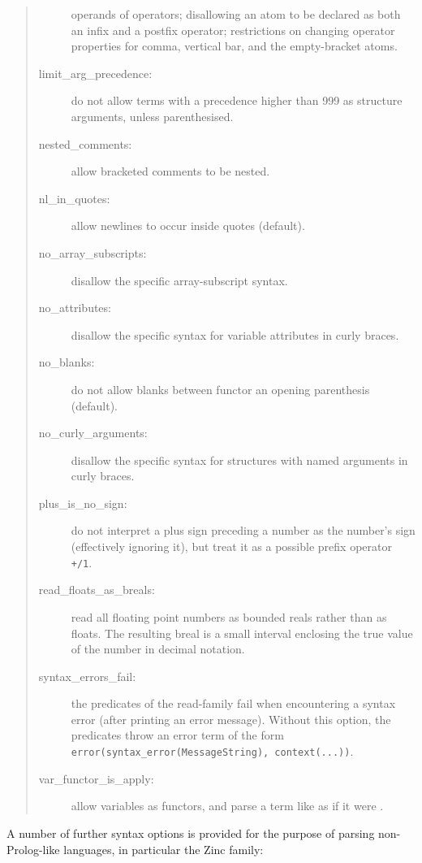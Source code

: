 \begin{quote}
\begin{description}
      operands of operators; disallowing an atom to be declared as both
      an infix and a postfix operator; restrictions on changing operator
      properties for comma, vertical bar, and the empty-bracket atoms.
\item[limit_arg_precedence:]
    do not allow terms with a precedence higher than 999 as
    structure arguments, unless parenthesised.
\item[nested_comments:] allow bracketed comments to be nested.
\item[nl_in_quotes:] allow newlines to occur inside quotes (default).
\item[no_array_subscripts:] disallow the {\eclipse} specific array-subscript
    syntax.
\item[no_attributes:] disallow the {\eclipse} specific syntax for
    variable attributes in curly braces.
\item[no_blanks:] do not allow blanks between functor an opening parenthesis
    (default).
\item[no_curly_arguments:] disallow the {\eclipse} specific syntax for
    structures with named arguments in curly braces.
\item[plus_is_no_sign:]
    do not interpret a plus sign preceding a number as the number's sign
    (effectively ignoring it), but treat it as a possible prefix operator
    \verb:+/1:.
\item[read_floats_as_breals:] read all floating point numbers as bounded
    reals rather than as floats. The resulting breal is a small interval
    enclosing the true value of the number in decimal notation.
\item[syntax_errors_fail:]
    the predicates of the read-family fail when encountering a
    syntax error (after printing an error message).  Without this
    option, the predicates throw an error term of the form
    \verb:error(syntax_error(MessageString), context(...)):.
\item[var_functor_is_apply:] allow variables as functors, and parse a term
    like  as if it were .
\end{description}
\end{quote}
A number of further syntax options is provided for the purpose of parsing
non-Prolog-like languages, in particular the Zinc family:
